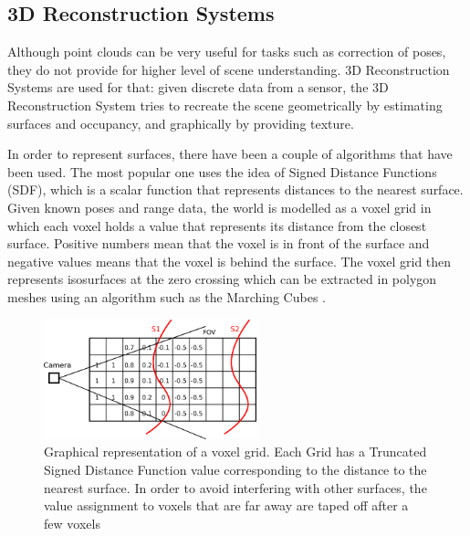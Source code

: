 \documentclass[11pt]{article}
\begin{document}
	\subsection{3D Reconstruction Systems}

Although point clouds can be very useful for tasks such as correction of poses, they do not provide for higher level of scene understanding. 3D Reconstruction Systems are used for that: given discrete data from a sensor, the 3D Reconstruction System tries to recreate the scene geometrically by estimating surfaces and occupancy, and graphically by providing texture.
		
In order to represent surfaces, there have been a couple of algorithms that have been used. The most popular one uses the idea of Signed Distance Functions (SDF), which is a scalar function that represents distances to the nearest surface. Given known poses and range data, the world is modelled as a voxel grid in which each voxel holds  a value that represents its distance from the closest surface. Positive numbers mean that the voxel is in front of the surface and negative values means that the voxel is behind the surface. The voxel grid then represents isosurfaces at the zero crossing which can be extracted in polygon meshes using an algorithm such as the Marching Cubes \cite{marchingcubes}.
	
\begin{figure}
	\centering
	\includegraphics[width=0.55\textwidth]{TSDF}
	\caption[t]{Graphical representation of a voxel grid. Each Grid has a Truncated Signed Distance Function value corresponding to the distance to the nearest surface. In order to avoid interfering with other surfaces, the value assignment to voxels that are far away are taped off after a few voxels}
	\label{fig:TSDF}
\end{figure}
\end{document}

